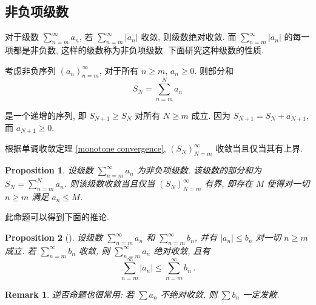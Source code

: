 \documentclass[UTF8]{ctexart}
\theoremstyle{mystyle}
\newtheorem{proposition}{Proposition}[section]
\theoremstyle{myremark}
\newtheorem*{remark}{Remark}
\theoremstyle{plain}
\begin{document}
\subsection{非负项级数}
对于级数 $ \displaystyle \sum_{n = m}^{\infty} a_n $, 若 $ \displaystyle \sum_{n = m}^{\infty} |a_n| $ 收敛, 则级数绝对收敛. 而 $ \displaystyle \sum_{n = m}^{\infty} |a_n| $ 的每一项都是非负数, 这样的级数称为非负项级数. 下面研究这种级数的性质.

考虑非负序列 $ (a_n)_{n = m}^\infty $, 对于所有 $ n \geqslant m $, $ a_n \geqslant 0 $. 则部分和
\[ S_N = \sum_{n = m}^{N} a_n \]

是一个递增的序列, 即 $ S_{N + 1} \geqslant S_N $ 对所有 $ N \geqslant m $ 成立. 因为 $ \displaystyle S_{N + 1} = S_N + a_{N + 1} $, 而 $ a_{N + 1} \geqslant 0 $.

根据单调收敛定理 \ref{monotone convergence}, $ (S_N)_{N = m}^\infty $ 收敛当且仅当其有上界.

\begin{proposition} 
    设级数 $ \displaystyle \sum_{n = m}^{\infty} a_n $ 为非负项级数. 该级数的部分和为 $ \displaystyle S_N = \sum_{n = m}^{N} a_n $. 则该级数收敛当且仅当 $ (S_N)_{N = m}^\infty $ 有界, 即存在 $ M $ 使得对一切 $ n \geqslant m $ 满足 $ a_n \leqslant M $.
\end{proposition}

此命题可以得到下面的推论.

\begin{proposition}[]
    设级数 $ \displaystyle \sum_{n = m}^{\infty} a_n $ 和 $ \displaystyle \sum_{n = m}^{\infty} b_n $, 并有 $ |a_n| \leqslant b_n $ 对一切 $ n \geqslant m $ 成立. 若 $ \displaystyle \sum_{n = m}^{\infty} b_n $ 收敛, 则 $ \displaystyle \sum_{n = m}^{\infty} a_n $ 绝对收敛, 且有 \[ \sum_{n = m}^{\infty} |a_n| \leqslant \sum_{n = m}^{\infty} b_n \,.\]
\end{proposition}

\begin{remark}
    逆否命题也很常用: 若 $ \sum a_n $ 不绝对收敛, 则 $ \sum b_n $ 一定发散.
\end{remark}
\end{document}
